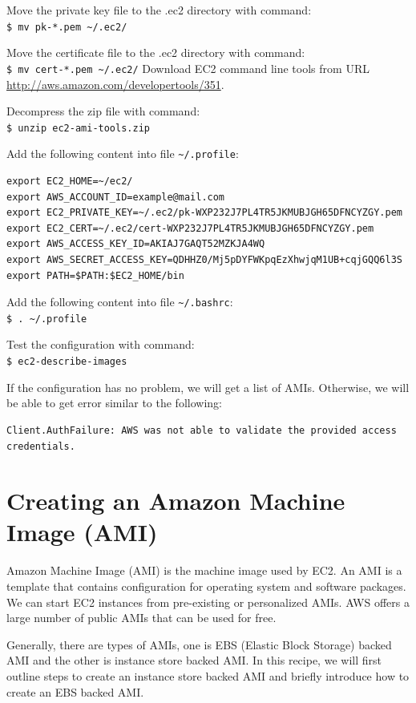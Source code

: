 Move the private key file to the .ec2 directory with command: \\
\verb|$ mv pk-*.pem ~/.ec2/|

Move the certificate file to the .ec2 directory with command: \\
\verb|$ mv cert-*.pem ~/.ec2/|
Download EC2 command line tools from URL \url{http://aws.amazon.com/developertools/351}.


Decompress the zip file with command: \\
\verb|$ unzip ec2-ami-tools.zip|

Add the following content into file \verb|~/.profile|:
\lstset{style=bashstyle}
\begin{lstlisting}
export EC2_HOME=~/ec2/
export AWS_ACCOUNT_ID=example@mail.com
export EC2_PRIVATE_KEY=~/.ec2/pk-WXP232J7PL4TR5JKMUBJGH65DFNCYZGY.pem
export EC2_CERT=~/.ec2/cert-WXP232J7PL4TR5JKMUBJGH65DFNCYZGY.pem
export AWS_ACCESS_KEY_ID=AKIAJ7GAQT52MZKJA4WQ
export AWS_SECRET_ACCESS_KEY=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
export PATH=$PATH:$EC2_HOME/bin
\end{lstlisting}

Add the following content into file \verb|~/.bashrc|: \\
\verb|$ . ~/.profile|

Test the configuration with command: \\
\verb|$ ec2-describe-images|

If the configuration has no problem, we will get a list of AMIs. Otherwise, we will be able to get error similar to the following:
\lstset{style=bashstyle}
\begin{lstlisting}
Client.AuthFailure: AWS was not able to validate the provided access credentials.
\end{lstlisting}
\section{Creating an Amazon Machine Image (AMI)}
Amazon Machine Image (AMI) is the machine image used by EC2. An AMI is a template that contains configuration for operating system and software packages. We can start EC2 instances from pre-existing or personalized AMIs. AWS offers a large number of public AMIs that can be used for free.

Generally, there are types of AMIs, one is EBS (Elastic Block Storage) backed AMI and the other is instance store backed AMI. In this recipe, we will first outline steps to create an instance store backed AMI and briefly introduce how to create an EBS backed AMI.
